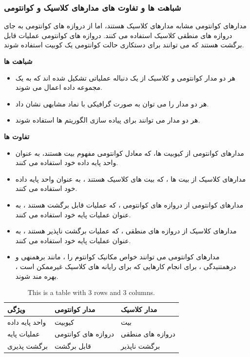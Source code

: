 \documentclass{book}
\begin{document}
\subsubsection{شباهت ها و تفاوت های مدارهای کلاسیک و کوانتومی}
مدارهای کوانتومی مشابه مدارهای کلاسیک هستند، اما از دروازه های کوانتومی به جای دروازه های منطقی کلاسیک استفاده می کنند. دروازه های کوانتومی عملیات قابل برگشت هستند که می توانند برای دستکاری حالت کوانتومی یک کوبیت استفاده شوند.

\textbf{شباهت ها}

\begin{itemize}
	\item هر دو مدار کوانتومی و کلاسیک از یک دنباله عملیاتی تشکیل شده اند که به یک مجموعه داده اعمال می شوند.
	\item هر دو مدار را می توان به صورت گرافیکی با نماد مشابهی نشان داد.
	\item هر دو مدار می توانند برای پیاده سازی الگوریتم ها استفاده شوند.
\end{itemize}

\textbf{تفاوت ها}

\begin{itemize}
	\item مدارهای کوانتومی از کیوبیت ها، که معادل کوانتومی مفهوم بیت هستند، به عنوان واحد پایه داده خود استفاده می کنند. 
	\item مدارهای کلاسیک از بیت ها ، که بیت های کلاسیک هستند ، به عنوان واحد پایه داده خود استفاده می کنند.
	\item مدارهای کوانتومی از دروازه های کوانتومی ، که عملیات قابل برگشت هستند ، به عنوان عملیات پایه خود استفاده می کنند.
	\item  مدارهای کلاسیک از دروازه های منطقی ، که عملیات برگشت ناپذیر هستند ، به عنوان عملیات پایه خود استفاده می کنند.
	\item مدارهای کوانتومی می توانند خواص مکانیک کوانتوم را ، مانند برهمنهی و درهمتنیدگی ، برای انجام کارهایی که برای رایانه های کلاسیک غیرممکن است ، بهره مند شوند.
\end{itemize}



\begin{table}[ht]
	\centering
	\begin{tabular}{|p{100pt}|p{100pt}|p{100pt}|}
		\hline
		ویژگی & مدار کوانتومی &مدار کلاسیک \\
		\hline
		واحد پایه داده & کیوبیت & بیت \\
		\hline
	      عملیات پایه & دروازه های کوانتومی & دروازه های منطقی \\
		\hline
		برگشت پذیری & قابل برگشت & برگشت ناپذیر \\
		\hline
	\end{tabular}
	\caption{This is a table with 3 rows and 3 columns.}
\end{table}
\end{document}
